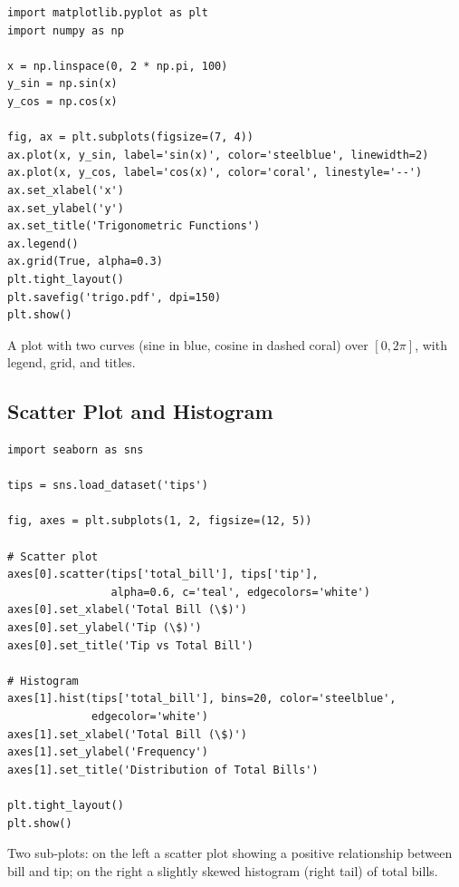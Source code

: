\begin{codeblock}[title=\textbf{Python}]
\begin{verbatim}
import matplotlib.pyplot as plt
import numpy as np

x = np.linspace(0, 2 * np.pi, 100)
y_sin = np.sin(x)
y_cos = np.cos(x)

fig, ax = plt.subplots(figsize=(7, 4))
ax.plot(x, y_sin, label='sin(x)', color='steelblue', linewidth=2)
ax.plot(x, y_cos, label='cos(x)', color='coral', linestyle='--')
ax.set_xlabel('x')
ax.set_ylabel('y')
ax.set_title('Trigonometric Functions')
ax.legend()
ax.grid(True, alpha=0.3)
plt.tight_layout()
plt.savefig('trigo.pdf', dpi=150)
plt.show()
\end{verbatim}
\end{codeblock}

\begin{codeoutput}
A plot with two curves (sine in blue, cosine in dashed coral) over $[0, 2\pi]$, with legend, grid, and titles.
\end{codeoutput}

\subsection{Scatter Plot and Histogram}

\begin{codeblock}[title=\textbf{Python}]
\begin{verbatim}
import seaborn as sns

tips = sns.load_dataset('tips')

fig, axes = plt.subplots(1, 2, figsize=(12, 5))

# Scatter plot
axes[0].scatter(tips['total_bill'], tips['tip'],
                alpha=0.6, c='teal', edgecolors='white')
axes[0].set_xlabel('Total Bill (\$)')
axes[0].set_ylabel('Tip (\$)')
axes[0].set_title('Tip vs Total Bill')

# Histogram
axes[1].hist(tips['total_bill'], bins=20, color='steelblue',
             edgecolor='white')
axes[1].set_xlabel('Total Bill (\$)')
axes[1].set_ylabel('Frequency')
axes[1].set_title('Distribution of Total Bills')

plt.tight_layout()
plt.show()
\end{verbatim}
\end{codeblock}

\begin{codeoutput}
Two sub-plots: on the left a scatter plot showing a positive relationship between bill and tip; on the right a slightly skewed histogram (right tail) of total bills.
\end{codeoutput}

